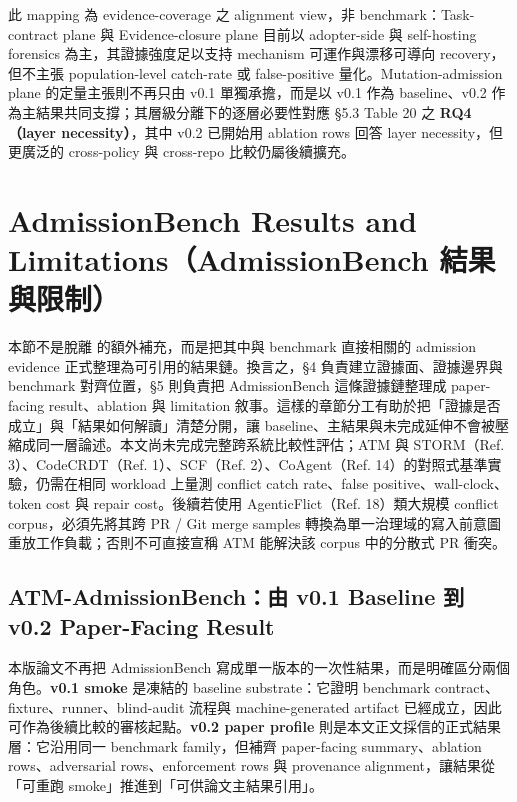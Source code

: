 \documentclass[a4paper,fontset=none]{ctexart}
\begin{document}
此 mapping 為 evidence-coverage 之 alignment view，非 benchmark：Task-contract plane 與 Evidence-closure plane 目前以 adopter-side 與 self-hosting forensics 為主，其證據強度足以支持 mechanism 可運作與漂移可導向 recovery，但不主張 population-level catch-rate 或 false-positive 量化。Mutation-admission plane 的定量主張則不再只由 v0.1 單獨承擔，而是以 v0.1 作為 baseline、v0.2 作為主結果共同支撐；其層級分離下的逐層必要性對應 §5.3 Table 20 之 \textbf{RQ4（layer necessity）}，其中 v0.2 已開始用 ablation rows 回答 layer necessity，但更廣泛的 cross-policy 與 cross-repo 比較仍屬後續擴充。

\medskip

\section{AdmissionBench Results and Limitations（AdmissionBench 結果與限制）}

本節不是脫離 \texttt{} 的額外補充，而是把其中與 benchmark 直接相關的 admission evidence 正式整理為可引用的結果鏈。換言之，§4 負責建立證據面、證據邊界與 benchmark 對齊位置，§5 則負責把 AdmissionBench 這條證據鏈整理成 paper-facing result、ablation 與 limitation 敘事。這樣的章節分工有助於把「證據是否成立」與「結果如何解讀」清楚分開，讓 baseline、主結果與未完成延伸不會被壓縮成同一層論述。本文尚未完成完整跨系統比較性評估；ATM 與 STORM（Ref. 3）、CodeCRDT（Ref. 1）、SCF（Ref. 2）、CoAgent（Ref. 14）的對照式基準實驗，仍需在相同 workload 上量測 conflict catch rate、false positive、wall-clock、token cost 與 repair cost。後續若使用 AgenticFlict（Ref. 18）類大規模 conflict corpus，必須先將其跨 PR / Git merge samples 轉換為單一治理域的寫入前意圖重放工作負載；否則不可直接宣稱 ATM 能解決該 corpus 中的分散式 PR 衝突。

\subsection{ATM-AdmissionBench：由 v0.1 Baseline 到 v0.2 Paper-Facing Result}

本版論文不再把 AdmissionBench 寫成單一版本的一次性結果，而是明確區分兩個角色。\textbf{v0.1 smoke} 是凍結的 baseline substrate：它證明 benchmark contract、fixture、runner、blind-audit 流程與 machine-generated artifact 已經成立，因此可作為後續比較的審核起點。\textbf{v0.2 paper profile} 則是本文正文採信的正式結果層：它沿用同一 benchmark family，但補齊 paper-facing summary、ablation rows、adversarial rows、enforcement rows 與 provenance alignment，讓結果從「可重跑 smoke」推進到「可供論文主結果引用」。
\end{document}
